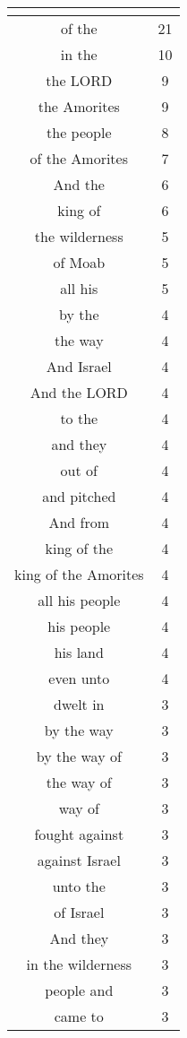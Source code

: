 \begin{center}
\begin{longtable}{|c|c|}
\hline \multicolumn{2}{c}{{ }} \\ \hline
\endfoot 
of the & 21\\ \hline 
in the & 10\\ \hline 
the LORD & 9\\ \hline 
the Amorites & 9\\ \hline 
the people & 8\\ \hline 
of the Amorites & 7\\ \hline 
And the & 6\\ \hline 
king of & 6\\ \hline 
the wilderness & 5\\ \hline 
of Moab & 5\\ \hline 
all his & 5\\ \hline 
by the & 4\\ \hline 
the way & 4\\ \hline 
And Israel & 4\\ \hline 
And the LORD & 4\\ \hline 
to the & 4\\ \hline 
and they & 4\\ \hline 
out of & 4\\ \hline 
and pitched & 4\\ \hline 
And from & 4\\ \hline 
king of the & 4\\ \hline 
king of the Amorites & 4\\ \hline 
all his people & 4\\ \hline 
his people & 4\\ \hline 
his land & 4\\ \hline 
even unto & 4\\ \hline 
dwelt in & 3\\ \hline 
by the way & 3\\ \hline 
by the way of & 3\\ \hline 
the way of & 3\\ \hline 
way of & 3\\ \hline 
fought against & 3\\ \hline 
against Israel & 3\\ \hline 
unto the & 3\\ \hline 
of Israel & 3\\ \hline 
And they & 3\\ \hline 
in the wilderness & 3\\ \hline 
people and & 3\\ \hline 
came to & 3\\ \hline 

\end{longtable}
\end{center}
